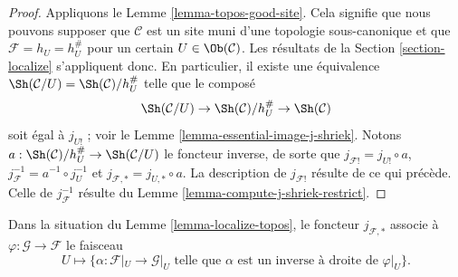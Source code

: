 \begin{proof}
Appliquons le Lemme \ref{lemma-topos-good-site}.
Cela signifie que nous pouvons supposer que $\mathcal{C}$ est un site muni
d’une topologie sous-canonique et que $\mathcal{F} = h_U = h_U^\#$ pour un
certain $U \in \Ob(\mathcal{C})$.
Les résultats de la Section \ref{section-localize} s’appliquent donc. En
particulier, il existe une équivalence
$\Sh(\mathcal{C}/U) = \Sh(\mathcal{C})/h_U^\#$ telle que le composé
$$
\Sh(\mathcal{C}/U)
\to
\Sh(\mathcal{C})/h_U^\#
\to \Sh(\mathcal{C})
$$
soit égal à $j_{U!}$ ; voir le
Lemme \ref{lemma-essential-image-j-shriek}.
Notons $a : \Sh(\mathcal{C})/h_U^\# \to \Sh(\mathcal{C}/U)$ le foncteur
inverse, de sorte que $j_{\mathcal{F}!} = j_{U!} \circ a$,
$j_\mathcal{F}^{-1} = a^{-1} \circ j_U^{-1}$ et
$j_{\mathcal{F}, *} = j_{U, *} \circ a$. La description de
$j_{\mathcal{F}!}$ résulte de ce qui précède. Celle de
$j_\mathcal{F}^{-1}$ résulte du
Lemme \ref{lemma-compute-j-shriek-restrict}.
\end{proof}

\begin{lemma}
\label{lemma-localize-pushforward}
Dans la situation du Lemme \ref{lemma-localize-topos}, le foncteur
$j_{\mathcal{F}, *}$ associe à
$\varphi : \mathcal{G} \to \mathcal{F}$ le faisceau
$$
U
\longmapsto
\{\alpha : \mathcal{F}|_U \to \mathcal{G}|_U
\text{ telle que } \alpha \text{ est un inverse à droite de }\varphi|_U \}.
$$
\end{lemma}

